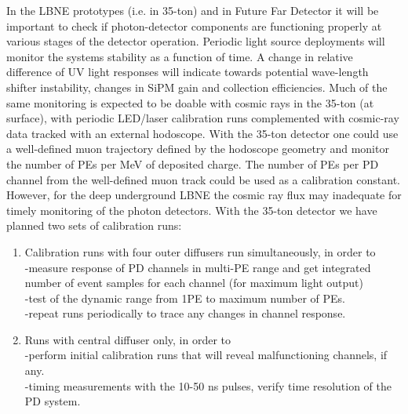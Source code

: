 In the LBNE prototypes (i.e. in 35-ton) and in Future Far Detector it
will be important to check if photon-detector components are
functioning properly at various stages of the detector
operation. Periodic light source deployments will monitor the systems
stability as a function of time. A change in relative difference of UV
light responses will indicate towards potential wave-length shifter
instability, changes in SiPM gain and collection efficiencies. Much of
the same monitoring is expected to be doable with cosmic rays in the
35-ton (at surface), with periodic LED/laser calibration runs
complemented with cosmic-ray data tracked with an external
hodoscope. With the 35-ton detector one could use a well-defined muon
trajectory defined by the hodoscope geometry and monitor the number of
PEs per MeV of deposited charge. The number of PEs per PD channel from
the well-defined muon track could be used as a calibration
constant. However, for the deep underground LBNE the cosmic ray flux
may inadequate for timely monitoring of the photon detectors.  With
the 35-ton detector we have planned two sets of calibration runs:
\begin{enumerate}
\item Calibration runs with four outer diffusers run simultaneously,
  in order to\\ -measure response of PD channels in multi-PE range and
  get integrated number of event samples for each channel (for maximum
  light output)\\ -test of the dynamic range from 1PE to maximum
  number of PEs. \\ -repeat runs periodically to trace any changes in
  channel response.
       
\item Runs with central diffuser only, in order to\\ -perform initial
  calibration runs that will reveal malfunctioning channels, if
  any.\\ -timing measurements with the 10-50 ns pulses, verify time
  resolution of the PD system.
\end{enumerate}

